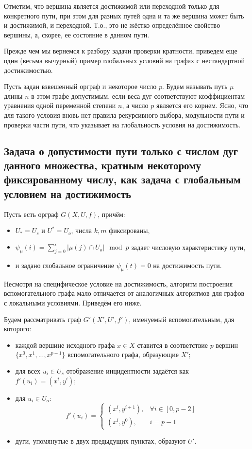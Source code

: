 	Отметим, что вершина является достижимой или переходной только для конкретного пути, при этом для разных путей одна и та же вершина может быть и достижимой, и переходной. Т.о., это не жёстко определённое свойство вершины, а, скорее, ее состояние в данном пути. 
	
	Прежде чем мы вернемся к разбору задачи проверки кратности, приведем еще один (весьма вычурный) пример глобальных условий на графах с нестандартной достижимостью.
	
	Пусть задан взвешенный орграф и некоторое число $p$. Будем называть путь $\mu$ длины $n$ в этом графе допустимым, если веса дуг соответствуют коэффициентам уравнения одной переменной степени $n$, а число $p$ является его корнем. Ясно, что для такого условия вновь нет правила рекурсивного выбора, модульности пути и проверки части пути, что указывает на глобальность условия на достижимость. 
	
	\subsection{Задача о допустимости пути только с числом дуг данного множества, кратным некоторому фиксированному числу, как задача с глобальным условием на достижимость}
	
	Пусть есть орграф $G(X,U,f)$, причём:
	\begin{itemize}
		\item $U_* = U_s$ и $U^* = U_o$, числа $k, m$ фиксированы,
		\item $\psi_\mu(i) = \sum_{j=0}^i | \mu(j) \cap U_o | \mod p$ задает числовую характеристику пути, 
		\item и задано глобальное ограничение $\psi_\mu(t) = 0$ на достижимость пути.
	\end{itemize}
	
	Несмотря на специфическое условие на достижимость, алгоритм построения вспомогательного графа мало отличается от аналогичных алгоритмов для графов с локальными условиями. Приведём его ниже.
	
	Будем рассматривать граф $G'(X',U',f')$, именуемый вспомогательным, для которого: 
	\begin{itemize}
		\item каждой вершине исходного графа $x \in X$ ставится в соответствие $p$ вершин $\{x^0, x^1, ... , x^{p-1} \}$ вспомогательного графа, образующие $X'$;
		\item для всех $u_i \in U_s$ отображение инцидентности задаётся как $f'(u_i) = (x^i, y^i)$;
		\item для $u_i \in U_o$:
		\begin{equation*}
		f'(u_i) = 
		\begin{cases}
		(x^i, y^{i+1}), &\text{$\forall i \in [0, p-2]$}\\
		(x^i, y^0), &\text{$i = p-1$}
		\end{cases}
		\end{equation*}
		\item дуги, упомянутые в двух предыдущих пунктах, образуют $U'$.
	\end{itemize}
	
